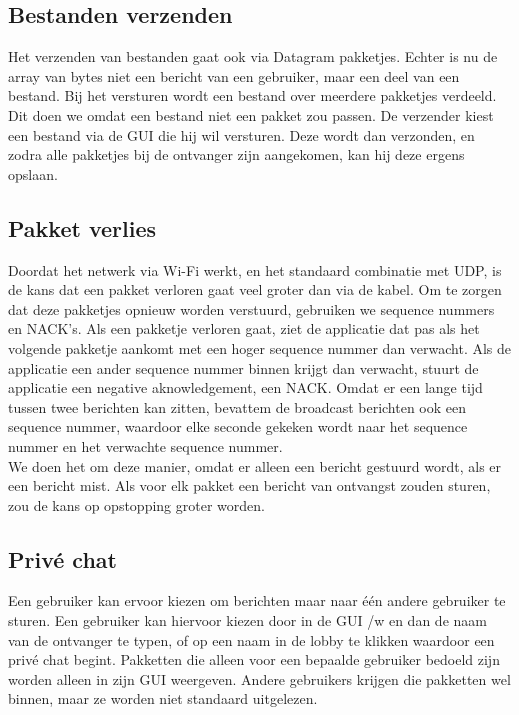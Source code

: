 \documentclass{article}
\begin{document}
\subsection{Bestanden verzenden}
Het verzenden van bestanden gaat ook via Datagram pakketjes. Echter is nu de array van bytes niet een bericht van een gebruiker, maar een deel van een bestand. Bij het versturen wordt een bestand over meerdere pakketjes verdeeld. Dit doen we omdat een bestand niet een pakket zou passen. De verzender kiest een bestand via de GUI die hij wil versturen. Deze wordt dan verzonden, en zodra alle pakketjes bij de ontvanger zijn aangekomen, kan hij deze ergens opslaan. \\


\subsection{Pakket verlies}
Doordat het netwerk via Wi-Fi werkt, en het standaard combinatie met UDP, is de kans dat een pakket verloren gaat veel groter dan via de kabel. Om te zorgen dat deze pakketjes opnieuw worden verstuurd, gebruiken we sequence nummers en NACK's. Als een pakketje verloren gaat, ziet de applicatie dat pas als het volgende pakketje aankomt met een hoger sequence nummer dan verwacht. Als de applicatie een ander sequence nummer binnen krijgt dan verwacht, stuurt de applicatie een negative aknowledgement, een NACK. Omdat er een lange tijd tussen twee berichten kan zitten, bevattem de broadcast berichten ook een sequence nummer, waardoor elke seconde gekeken wordt naar het sequence nummer en het verwachte sequence nummer. \\
We doen het om deze manier, omdat er alleen een bericht gestuurd wordt, als er een bericht mist. Als voor elk pakket een bericht van ontvangst zouden sturen, zou de kans op opstopping groter worden. \\

\subsection{Priv\'{e} chat}
Een gebruiker kan ervoor kiezen om berichten maar naar \'{e}\'{e}n andere gebruiker te sturen. Een gebruiker kan hiervoor kiezen door in de GUI /w en dan de naam van de ontvanger te typen, of op een naam in de lobby te klikken waardoor een priv\'{e} chat begint. Pakketten die alleen voor een bepaalde gebruiker bedoeld zijn worden alleen in zijn GUI weergeven. Andere gebruikers krijgen die pakketten wel binnen, maar ze worden niet standaard uitgelezen. \\
\end{document}
